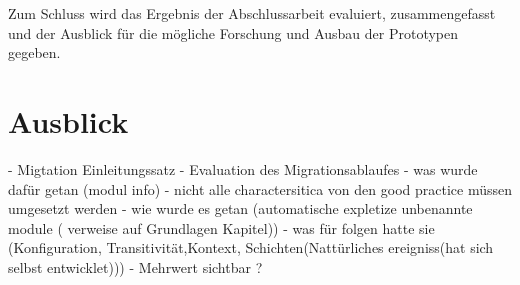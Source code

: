  Zum Schluss wird das Ergebnis der Abschlussarbeit evaluiert, zusammengefasst und der Ausblick für die mögliche Forschung und Ausbau der Prototypen gegeben. 


\section{Ausblick} 



\newpage

- Migtation Einleitungssatz 
- Evaluation des Migrationsablaufes
	- was wurde dafür getan (modul info)
	-  nicht alle charactersitica von den good practice müssen umgesetzt werden
	- wie wurde es getan (automatische expletize unbenannte module ( verweise auf Grundlagen Kapitel))
	- was für folgen hatte sie (Konfiguration, Transitivität,Kontext, Schichten(Nattürliches ereigniss(hat sich selbst entwicklet)))
	- Mehrwert  sichtbar ?




